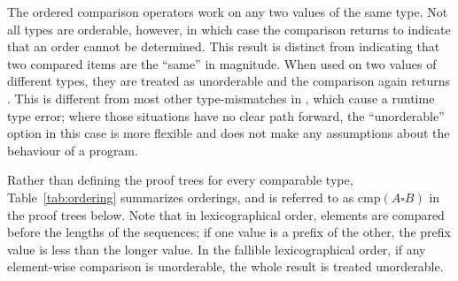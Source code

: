 \begin{prooftree}
\end{prooftree}

\begin{prooftree}
\end{prooftree}

\FloatBarrier
The ordered comparison operators work on any two values of the same type. Not
all types are orderable, however, in which case the comparison returns 
to indicate that an order cannot be determined. This  result is distinct
from indicating that two compared items are the ``same'' in magnitude. When used
on two values of different types, they are treated as unorderable and the comparison
again returns . This is different from most other type-mismatches in \Trilogy{},
which cause a runtime type error; where those situations have no clear path forward,
the ``unorderable'' option in this case is more flexible and does not make any
assumptions about the behaviour of a program.

Rather than defining the proof trees for every comparable type, Table~\ref{tab:ordering} summarizes
orderings, and is referred to as $\text{cmp}(A \square B)$ in the proof trees below. Note
that in lexicographical order, elements are compared before the lengths of the sequences;
if one value is a prefix of the other, the prefix value is less than the longer value.
In the fallible lexicographical order, if any element-wise comparison is unorderable, the
whole result is treated unorderable.

